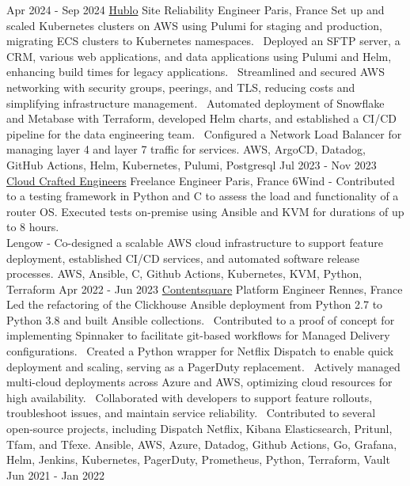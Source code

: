 \documentclass[10pt]{developercv}
\begin{document}
\begin{entrylist}
	\entry
		{Apr 2024 - Sep 2024}
		{\href{https://www.hublo.com/}{Hublo}}
		{Site Reliability Engineer}
		{Paris, France}
		{Set up and scaled Kubernetes clusters on AWS using Pulumi for staging and production, migrating ECS clusters to Kubernetes namespaces. \ 
		Deployed an SFTP server, a CRM, various web applications, and data applications using Pulumi and Helm, enhancing build times for legacy applications. \ 
		Streamlined and secured AWS networking with security groups, peerings, and TLS, reducing costs and simplifying infrastructure management. \ 
		Automated deployment of Snowflake and Metabase with Terraform, developed Helm charts, and established a CI/CD pipeline for the data engineering team. \ 
		Configured a Network Load Balancer for managing layer 4 and layer 7 traffic for services.
		}
		{AWS, ArgoCD, Datadog, GitHub Actions, Helm, Kubernetes, Pulumi, Postgresql}
	\entry
		{Jul 2023 - Nov 2023}
		{\href{https://craftedengineers.cloud/}{Cloud Crafted Engineers}}
		{Freelance Engineer}
		{Paris, France}
		{6Wind - Contributed to a testing framework in Python and C to assess the load and functionality of a router OS. Executed tests on-premise using Ansible and KVM for durations of up to 8 hours.\\
		Lengow - Co-designed a scalable AWS cloud infrastructure to support feature deployment, established CI/CD services, and automated software release processes.
		}
		{AWS, Ansible, C, Github Actions, Kubernetes, KVM, Python, Terraform}
	\entry
		{Apr 2022 - Jun 2023}
		{\href{https://contentsquare.com/}{Contentsquare}}
		{Platform Engineer}
		{Rennes, France}
		{Led the refactoring of the Clickhouse Ansible deployment from Python 2.7 to Python 3.8 and built Ansible collections. \ 
		Contributed to a proof of concept for implementing Spinnaker to facilitate git-based workflows for Managed Delivery configurations. \ 
		Created a Python wrapper for Netflix Dispatch to enable quick deployment and scaling, serving as a PagerDuty replacement. \ 
		Actively managed multi-cloud deployments across Azure and AWS, optimizing cloud resources for high availability. \ 
		Collaborated with developers to support feature rollouts, troubleshoot issues, and maintain service reliability. \ 
		Contributed to several open-source projects, including Dispatch Netflix, Kibana Elasticsearch, Pritunl, Tfam, and Tfexe.
		}
		{Ansible, AWS, Azure, Datadog, Github Actions, Go, Grafana, Helm, Jenkins, Kubernetes, PagerDuty, Prometheus, Python, Terraform, Vault}
	\entry
		{Jun 2021 - Jan 2022}

\end{entrylist}
\end{document}
